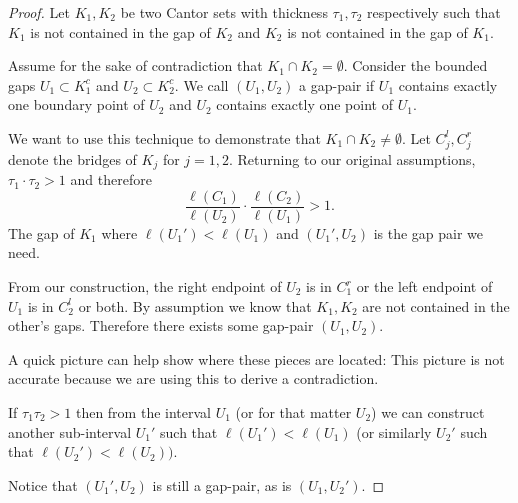 \begin{proof}
    Let $K_1, K_2$ be two Cantor sets with thickness $\tau_1, \tau_2$ respectively such that $K_1$ is not contained in the gap of $K_2$ and $K_2$ is not contained in the gap of $K_1$.  

    Assume for the sake of contradiction that $K_1 \cap K_2 = \emptyset$.  Consider the bounded gaps $U_1 \subset K_1^c$ and $U_2 \subset K_2^c$.  We call $(U_1, U_2)$ a gap-pair if $U_1$ contains exactly one boundary point of $U_2$ and $U_2$ contains exactly one point of $U_1$.  

    We want to use this technique to demonstrate that $K_1 \cap K_2 \neq \emptyset.$ Let $C_j^l, C_j^r$ denote the bridges of $K_j$ for $j = 1,2$.  Returning to our original assumptions, $\tau_1 \cdot \tau_2 > 1$ and therefore $$\frac{\ell(C_1)}{\ell(U_2)} \cdot \frac{\ell(C_2)}{\ell(U_1)} > 1.$$  
    The gap of $K_1$ where $\ell(U_1') < \ell(U_1)$ and $(U_1', U_2)$ is the gap pair we need.  
    
    From our construction, the right endpoint of $U_2$ is in $C_1^r$ or the left endpoint of $U_1$ is in $C_2^l$ or both.  By assumption we know that $K_1, K_2$ are not contained in the other's gaps. Therefore there exists some gap-pair $(U_1, U_2).$


    A quick picture can help show where these pieces are located:  This picture is not accurate because we are using this to derive a contradiction.
    
    \begin{claim}
        If $\tau_1\tau_2 > 1$ then from the interval $U_1$ (or for that matter $U_2$) we can construct another sub-interval $U_1'$ such that $\ell(U_1') < \ell(U_1)$ (or similarly $U_2'$ such that $\ell(U_2')<\ell(U_2)).$
    \end{claim}
    Notice that $(U_1',U_2)$ is still a gap-pair, as is $(U_1,U_2')$.
    

\end{proof}

